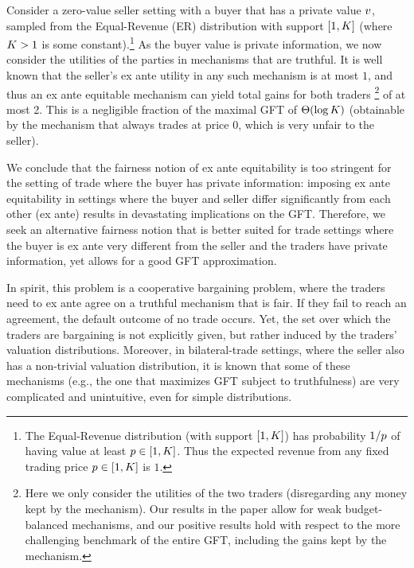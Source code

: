 Consider a zero-value seller setting with a buyer that has a private value $v$, sampled from the Equal-Revenue (ER) distribution with support $[1,K]$ (where $K>1$ is some constant).\footnote{The Equal-Revenue distribution (with support $[1,K]$) has probability $1/p$ of having value at least $p\in [1,K]$. Thus the expected revenue from any fixed trading price $p\in [1,K]$ is $1$.} As the buyer value is private information, we now consider the utilities of the parties in mechanisms that are truthful. It is well known \citep{mye-81} that the seller's ex ante utility in any such mechanism is at most $1$, and thus an ex ante equitable mechanism can yield total gains for both traders \footnote{Here we only consider the utilities of the two traders (disregarding any money kept by the mechanism). Our results in the paper allow for weak budget-balanced mechanisms, and our positive results hold with respect to the more challenging benchmark of the entire GFT, including the gains kept by the mechanism.} of at most 2. This is a negligible fraction of the maximal GFT of $\Theta(\log K)$ (obtainable by the mechanism that always trades at price 0, which is very unfair to the seller).

We conclude that the fairness notion of ex ante equitability is too stringent for the setting of trade where the buyer has private information: imposing ex ante equitability in settings where the buyer and seller differ significantly from each other (ex ante) results in devastating implications on the GFT. Therefore, we seek an alternative fairness notion that is better suited for trade settings where the buyer is ex ante very different from the seller and the traders have private information, yet allows for a good GFT approximation.


In spirit, this problem is a cooperative bargaining problem, where the traders need to ex ante agree on a truthful mechanism that is fair. If they fail to reach an agreement, the default outcome of no trade occurs. Yet, the set over which the traders are bargaining is not explicitly given, but rather induced by the traders' valuation distributions. Moreover, in bilateral-trade settings, where the seller also has a non-trivial valuation distribution, it is known that some of these mechanisms (e.g., the one that maximizes GFT subject to truthfulness) are very complicated and unintuitive, even for simple distributions. 

